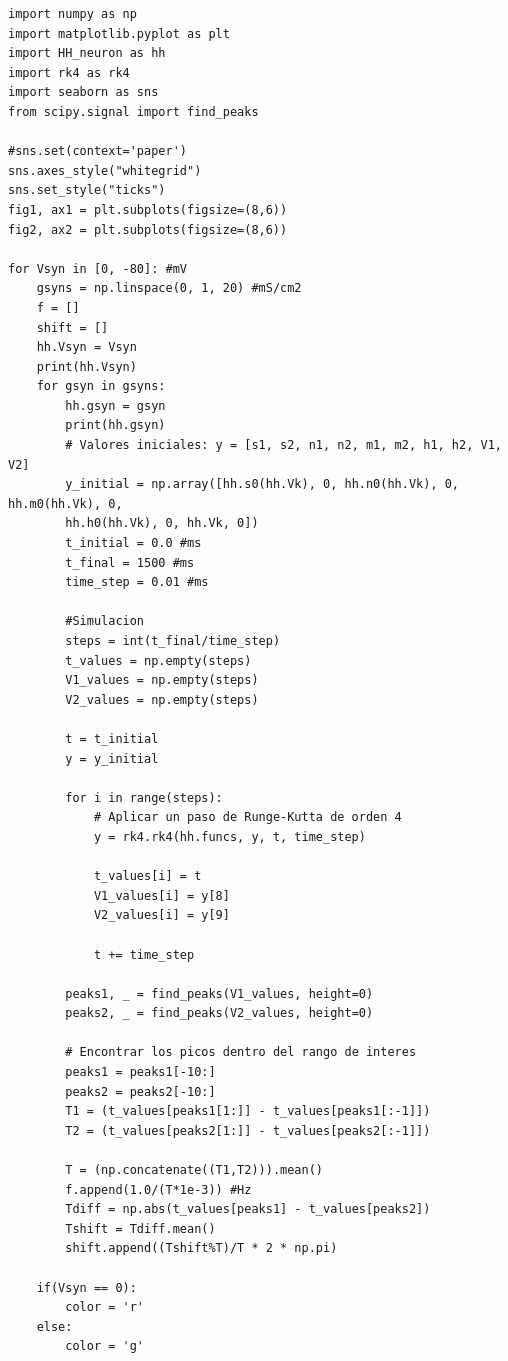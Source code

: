 \documentclass[11pt,twocolumn,twoside]{opticajnl}
\begin{document}
\begin{onecolumn}
\begin{lstlisting}
import numpy as np
import matplotlib.pyplot as plt
import HH_neuron as hh
import rk4 as rk4
import seaborn as sns
from scipy.signal import find_peaks

#sns.set(context='paper')
sns.axes_style("whitegrid")
sns.set_style("ticks")
fig1, ax1 = plt.subplots(figsize=(8,6)) 
fig2, ax2 = plt.subplots(figsize=(8,6)) 

for Vsyn in [0, -80]: #mV
    gsyns = np.linspace(0, 1, 20) #mS/cm2
    f = []
    shift = []
    hh.Vsyn = Vsyn
    print(hh.Vsyn)
    for gsyn in gsyns:
        hh.gsyn = gsyn
        print(hh.gsyn)
        # Valores iniciales: y = [s1, s2, n1, n2, m1, m2, h1, h2, V1, V2]
        y_initial = np.array([hh.s0(hh.Vk), 0, hh.n0(hh.Vk), 0, hh.m0(hh.Vk), 0, 
        hh.h0(hh.Vk), 0, hh.Vk, 0])
        t_initial = 0.0 #ms
        t_final = 1500 #ms
        time_step = 0.01 #ms

        #Simulacion
        steps = int(t_final/time_step) 
        t_values = np.empty(steps)
        V1_values = np.empty(steps)
        V2_values = np.empty(steps)

        t = t_initial
        y = y_initial

        for i in range(steps):
            # Aplicar un paso de Runge-Kutta de orden 4
            y = rk4.rk4(hh.funcs, y, t, time_step)

            t_values[i] = t
            V1_values[i] = y[8]
            V2_values[i] = y[9]
            
            t += time_step
                
        peaks1, _ = find_peaks(V1_values, height=0) 
        peaks2, _ = find_peaks(V2_values, height=0) 
        
        # Encontrar los picos dentro del rango de interes
        peaks1 = peaks1[-10:]
        peaks2 = peaks2[-10:]
        T1 = (t_values[peaks1[1:]] - t_values[peaks1[:-1]])
        T2 = (t_values[peaks2[1:]] - t_values[peaks2[:-1]])

        T = (np.concatenate((T1,T2))).mean()
        f.append(1.0/(T*1e-3)) #Hz
        Tdiff = np.abs(t_values[peaks1] - t_values[peaks2])
        Tshift = Tdiff.mean()
        shift.append((Tshift%T)/T * 2 * np.pi) 

    if(Vsyn == 0):
        color = 'r'
    else:
        color = 'g'


\end{lstlisting}
\end{onecolumn}
\end{document}
